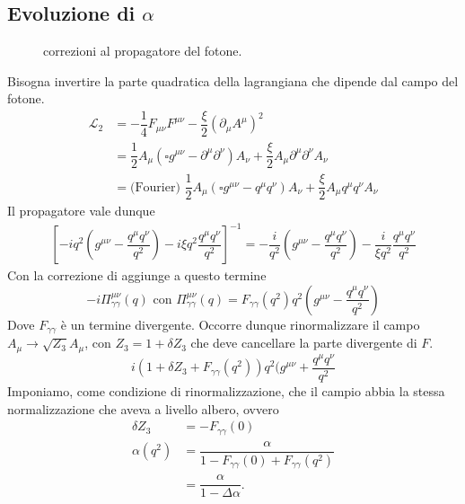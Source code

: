 \documentclass[italian,a4paper]{article}
\theoremstyle{definition}
\newcommand{\lagr}{\ensuremath{\mathscr{L}}}
\newcommand{\dimu}{\ensuremath{\partial_{\mu}}}
\begin{document}
\subsection{Evoluzione di $\alpha$}
\begin{figure}[h]
    \begin{center}
        
    \end{center}
    \caption{correzioni al propagatore del fotone.}
    \label{fig:propagatorefotone}
\end{figure}
Bisogna invertire la parte quadratica della lagrangiana che dipende dal
campo del fotone.
\begin{align*}
    \lagr_2 &= -\dfrac{1}{4}F_{\mu\nu}F^{\mu\nu} - \dfrac{\xi}{2}(\dimu
    A^\mu)^2\\
    &= \dfrac{1}{2}A_\mu(\square g^{\mu\nu} - \partial^\mu \partial^\nu) A_\nu
    +\dfrac{\xi}{2} A_\mu\partial^\mu \partial^\nu A_\nu\\                                      
    &= \text{(Fourier) } 
    \dfrac{1}{2}A_\mu(\square g^{\mu\nu} - q^\mu q^\nu) A_\nu
    +\dfrac{\xi}{2} A_\mu q^\mu q^\nu A_\nu
\end{align*}
Il propagatore vale dunque
\begin{align*}
    \left[ -iq^2(g^{\mu\nu} - \dfrac{q^\mu q^\nu}{q^2}) -i \xi q^2
    \dfrac{q^\mu q^\nu}{q^2}\right]^{-1} = 
    -\dfrac{i}{q^2}(g^{\mu\nu} - \dfrac{q^\mu q^\nu}{q^2}) - \dfrac{i}{\xi
    q^2} \dfrac{q^\mu q^\nu}{q^2}
\end{align*}
Con la correzione di aggiunge a questo termine
\begin{equation*}
    -i \Pi^{\mu\nu}_{\gamma\gamma}(q) \text{ con } 
    \Pi^{\mu\nu}_{\gamma\gamma}(q) = F_{\gamma\gamma}(q^2)q^2(g^{\mu\nu} -
    \dfrac{q^\mu q^\nu}{q^2})
\end{equation*}
Dove $F_{\gamma\gamma}$ \`e un termine divergente. Occorre dunque
rinormalizzare il campo $A_\mu \rightarrow \sqrt{Z_3}A_\mu$, con $Z_3 = 1 +
\delta Z_3$ che deve cancellare la parte divergente di $F$.
\begin{equation*}
    i(1 + \delta Z_3 + F_{\gamma\gamma}(q^2)) q^2 (g^{\mu\nu} +
    \dfrac{q^\mu q^\nu}{q^2}
\end{equation*}
Imponiamo, come condizione di rinormalizzazione, che il campio abbia la
stessa normalizzazione che aveva a livello albero, ovvero
\begin{align*}
    \delta Z_3 &= - F_{\gamma\gamma}(0)\\
    \alpha(q^2) &= \dfrac{\alpha}{1 - F_{\gamma\gamma}(0) +
    F_{\gamma\gamma}(q^2)}\\
    &= \dfrac{\alpha}{1 - \Delta \alpha}.
\end{align*}
\end{document}
